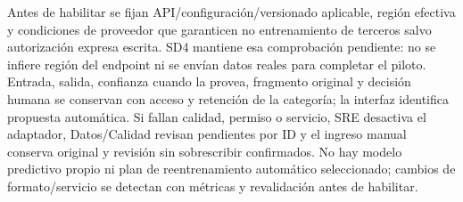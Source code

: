 Antes de habilitar se fijan API/configuración/versionado aplicable, región efectiva y condiciones de proveedor que garanticen no entrenamiento de terceros salvo autorización expresa escrita. SD4 mantiene esa comprobación pendiente: no se infiere región del endpoint ni se envían datos reales para completar el piloto. Entrada, salida, confianza cuando la provea, fragmento original y decisión humana se conservan con acceso y retención de la categoría; la interfaz identifica propuesta automática. Si fallan calidad, permiso o servicio, SRE desactiva el adaptador, Datos/Calidad revisan pendientes por ID y el ingreso manual conserva original y revisión sin sobrescribir confirmados. No hay modelo predictivo propio ni plan de reentrenamiento automático seleccionado; cambios de formato/servicio se detectan con métricas y revalidación antes de habilitar. \parencites[art.~86; pp.~44--45]{sd8-ba}[RT-18.01--09; RT-26.07; pp.~32, 45]{sd8-bt}
